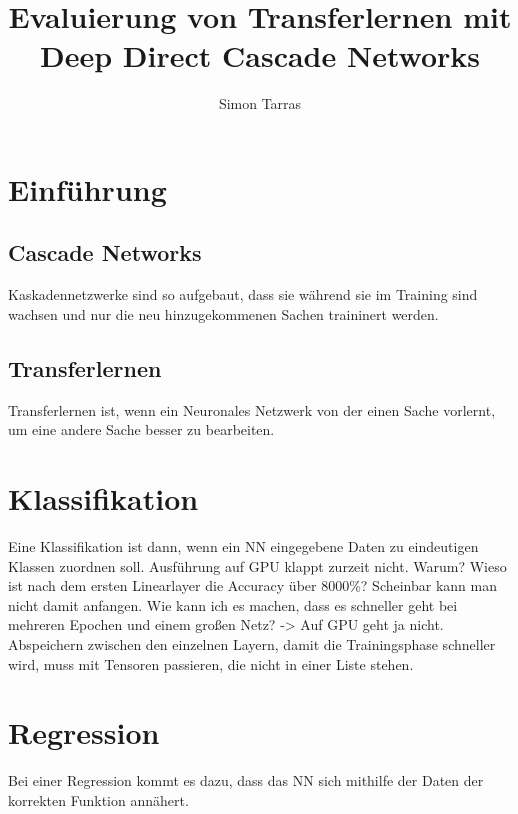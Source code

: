 \documentclass[ngerman]{report}
\title{Evaluierung von Transferlernen mit Deep Direct Cascade Networks}
\author{Simon Tarras}
\begin{document}
    \maketitle
    \chapter{Einführung}
        \section{Cascade Networks}
        Kaskadennetzwerke sind so aufgebaut, dass sie während sie 
        im Training sind wachsen und nur die neu hinzugekommenen 
        Sachen traininert werden.
        \section{Transferlernen}
        Transferlernen ist, wenn ein Neuronales Netzwerk von der 
        einen Sache vorlernt, um eine andere Sache besser zu 
        bearbeiten.
    \chapter{Klassifikation}
    Eine Klassifikation ist dann, wenn ein NN eingegebene Daten zu 
    eindeutigen Klassen zuordnen soll.
    Ausführung auf GPU klappt zurzeit nicht. Warum?
    Wieso ist nach dem ersten Linearlayer die Accuracy über 8000\%?
    Scheinbar kann man nicht damit anfangen.
    Wie kann ich es machen, dass es schneller geht bei mehreren Epochen 
    und einem großen Netz? -> Auf GPU geht ja nicht.
    Abspeichern zwischen den einzelnen Layern, damit die Trainingsphase 
    schneller wird, muss mit Tensoren passieren, die nicht in einer Liste 
    stehen. 
    \chapter{Regression}
    Bei einer Regression kommt es dazu, dass das NN sich mithilfe 
    der Daten der korrekten Funktion annähert.
\end{document}
